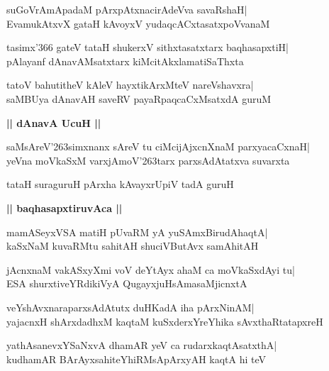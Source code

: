 \documentclass[twoside,12pt,openright]{book}
\def\S{\char'263}
\newcounter{shloka}[chapter]
\def\uvaca#1{\centerline{{\large\textbf{#1}}}}
\begin{document}
\begin{shloka}%
suGoVrAmApadaM pArxpAtxnacirAdeVva savaRshaH|\\
EvamukAtxvX gataH kAvoyxV yudaqcACxtasatxpoVvanaM
\end{shloka}

\begin{shloka}%
tasimx\char'366 gateV tataH shukerxV sithxtasatxtarx baqhasapxtiH|\\
pAlayanf dAnavAMsatxtarx kiMcitAkxlamatiSaThxta
\end{shloka}

\begin{shloka}%
tatoV bahutitheV kAleV hayxtikArxMteV nareVshavxra|\\
saMBUya dAnavAH saveRV payaRpaqcaCxMsatxdA guruM
\end{shloka}

\uvaca{|| dAnavA UcuH ||}
\begin{shloka}%
saMsAreV\S simxnanx sAreV tu ciMcijAjxcnXnaM parxyacaCxnaH|\\
yeVna moVkaSxM varxjAmoV\S tarx parxsAdAtatxva suvarxta
\end{shloka}

\begin{shloka}%
tataH suraguruH pArxha kAvayxrUpiV tadA guruH
\end{shloka}

\uvaca{|| baqhasapxtiruvAca ||}
\begin{shloka}%
mamASeyxVSA matiH pUvaRM yA yuSAmxBirudAhaqtA|\\
kaSxNaM kuvaRMtu sahitAH shuciVButAvx samAhitAH
\end{shloka}

\begin{shloka}%
jAcnxnaM vakASxyXmi voV deYtAyx ahaM ca moVkaSxdAyi tu|\\
ESA shurxtiveYRdikiVyA QugayxjuHsAmasaMjicnxtA
\end{shloka}

\begin{shloka}%
veYshAvxnaraparxsAdAtutx duHKadA iha pArxNinAM|\\
yajacnxH shArxdadhxM kaqtaM kuSxderxYreYhika sAvxthaRtatapxreH
\end{shloka}

\begin{shloka}%
yathAsanevxYSaNxvA dhamAR yeV ca rudarxkaqtAsatxthA|\\
kudhamAR BArAyxsahiteYhiRMsApArxyAH kaqtA hi teV
\end{shloka}
\end{document}
